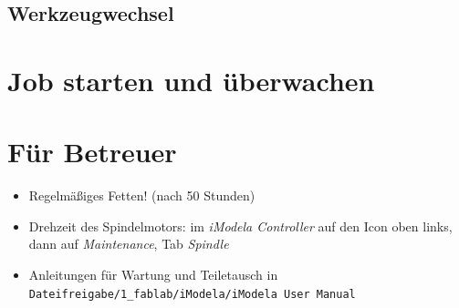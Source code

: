 \documentclass{\basedir/fablab-document}
\newcommand{\todo}[1]{\textbf{\color{red}{TODO: #1}}}
\begin{document}
\subsection{Werkzeugwechsel}
\todo{...}

\section{Job starten und überwachen}
\todo{...}

\section{Für Betreuer}
\begin{itemize}
	\item Regelmäßiges Fetten! (nach 50 Stunden)
	\item Drehzeit des Spindelmotors: im \emph{iModela Controller} auf den Icon oben links, dann auf \emph{Maintenance}, Tab \emph{Spindle} \todo{englisch oder deutsch?}
	\item Anleitungen für Wartung und Teiletausch in \texttt{Dateifreigabe/1\_fablab/iModela/iModela User Manual}
\end{itemize}
\end{document}
